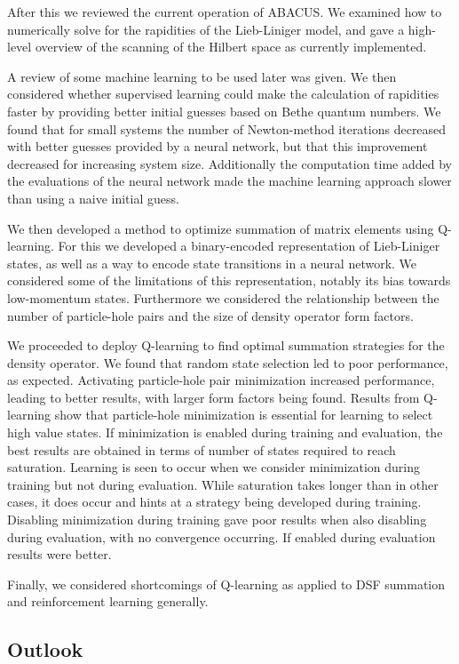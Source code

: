 \documentclass[11pt, a4paper]{report} %
\begin{document}
After this we reviewed the current operation of ABACUS.\@
We examined how to numerically solve for the rapidities of the Lieb-Liniger model, and gave a high-level overview of the scanning of the Hilbert space as currently implemented.

A review of some machine learning to be used later was given.
We then considered whether supervised learning could make the calculation of rapidities faster by providing better initial guesses based on Bethe quantum numbers.
We found that for small systems the number of Newton-method iterations decreased with better guesses provided by a neural network, but that this improvement decreased for increasing system size.
Additionally the computation time added by the evaluations of the neural network made the machine learning approach slower than using a naive initial guess.

We then developed a method to optimize summation of matrix elements using Q-learning.
For this we developed a binary-encoded representation of Lieb-Liniger states, as well as a way to encode state transitions in a neural network.
We considered some of the limitations of this representation, notably its bias towards low-momentum states.
Furthermore we considered the relationship between the number of particle-hole pairs and the size of density operator form factors.

We proceeded to deploy Q-learning to find optimal summation strategies for the density operator.
We found that random state selection led to poor performance, as expected.
Activating particle-hole pair minimization increased performance, leading to better results, with larger form factors being found.
Results from Q-learning show that particle-hole minimization is essential for learning to select high value states.
If minimization is enabled during training and evaluation, the best results are obtained in terms of number of states required to reach saturation.
Learning is seen to occur when we consider minimization during training but not during evaluation.
While saturation takes longer than in other cases, it does occur and hints at a strategy being developed during training.
Disabling minimization during training gave poor results when also disabling during evaluation, with no convergence occurring.
If enabled during evaluation results were better.

Finally, we considered shortcomings of Q-learning as applied to DSF summation and reinforcement learning generally.


\subsection{Outlook}
\end{document}
